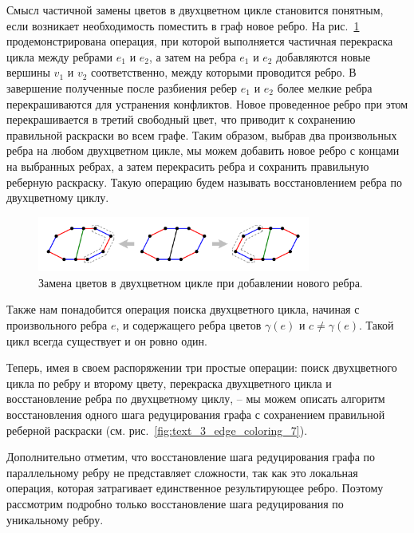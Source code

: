 Смысл частичной замены цветов в двухцветном цикле становится понятным, если возникает необходимость поместить в граф новое ребро.
На рис.~\ref{fig:text_3_edge_coloring_6} продемонстрирована операция, при которой выполняется частичная перекраска цикла между ребрами $e_1$ и $e_2$, а затем на ребра $e_1$ и $e_2$ добавляются новые вершины $v_1$ и $v_2$ соответственно, между которыми проводится ребро.
В завершение полученные после разбиения ребер $e_1$ и $e_2$ более мелкие ребра перекрашиваются для устранения конфликтов.
Новое проведенное ребро при этом перекрашивается в третий свободный цвет, что приводит к сохранению правильной раскраски во всем графе.
Таким образом, выбрав два произвольных ребра на любом двухцветном цикле, мы можем добавить новое ребро с концами на выбранных ребрах, а затем перекрасить ребра и сохранить правильную реберную раскраску.
Такую операцию будем называть восстановлением ребра по двухцветному циклу.

\begin{figure}[ht]
\centering
\includegraphics[width=0.8\textwidth]{./pics/text_3_edge_coloring/6-bicolor-cycle-new-edge.pdf}
\singlespacing
{}\caption{Замена цветов в двухцветном цикле при добавлении нового ребра.}
\label{fig:text_3_edge_coloring_6}
\end{figure}

Также нам понадобится операция поиска двухцветного цикла, начиная с произвольного ребра $e$, и содержащего ребра цветов $\gamma(e)$ и $c \ne \gamma(e)$. Такой цикл всегда существует и он ровно один.

Теперь, имея в своем распоряжении три простые операции: поиск двухцветного цикла по ребру и второму цвету, перекраска двухцветного цикла и восстановление ребра по двухцветному циклу, -- мы можем описать алгоритм восстановления одного шага редуцирования графа с сохранением правильной реберной раскраски (см. рис.~\ref{fig:text_3_edge_coloring_7}).

Дополнительно отметим, что восстановление шага редуцирования графа по параллельному ребру не представляет сложности, так как это локальная операция, которая затрагивает единственное результирующее ребро. Поэтому рассмотрим подробно только восстановление шага редуцирования по уникальному ребру.

